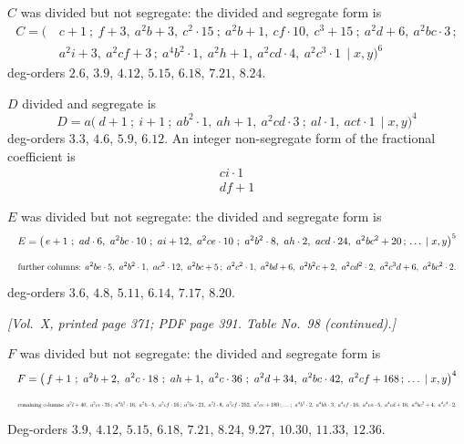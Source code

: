 \documentclass[11pt]{article}
\begin{document}
\noindent$C$ was divided but not segregate: the divided and segregate form is
\begin{align*}
C=\bigl(\,&c+1\ ;\ f+3,\ a^{2}b+3,\ c^{2}\cdot 15\ ;\ a^{2}b+1,\ cf\cdot 10,\ c^{3}+15\ ;\ a^{2}d+6,\ a^{2}bc\cdot 3\,;\\
&a^{2}i+3,\ a^{2}cf+3\,;\ a^{4}b^{2}\cdot 1,\ a^{2}h+1,\ a^{2}cd\cdot 4,\ a^{2}c^{3}\cdot 1\,\mid x,y\bigr)^{6}
\end{align*}
deg-orders $2.6$, $3.9$, $4.12$, $5.15$, $6.18$, $7.21$, $8.24$.

\medskip

\noindent$D$ divided and segregate is
\[
D=a\bigl(\ d+1\ ;\ i+1\ ;\ ab^{2}\cdot 1,\ ah+1,\ a^{2}cd\cdot 3\ ;\ al\cdot 1,\ act\cdot 1\,\mid x,y\bigr)^{4}
\]
deg-orders $3.3$, $4.6$, $5.9$, $6.12$. An integer non-segregate form of the fractional coefficient is
\[
\begin{array}{r}
ci\cdot 1\\
df+1
\end{array}
\]

\medskip

\noindent$E$ was divided but not segregate: the divided and segregate form is
\[
\resizebox{\textwidth}{!}{$\displaystyle
E=\bigl(\,e+1\ ;\ ad\cdot 6,\ a^{2}bc\cdot 10\ ;\ ai+12,\ a^{2}ce\cdot 10\ ;\ a^{2}b^{2}\cdot 8,\ ah\cdot 2,\ acd\cdot 24,\ a^{2}bc^{2}+20\,;\,\ldots\,\mid x,y\bigr)^{5}
$}
\]
\[
\resizebox{\textwidth}{!}{$\displaystyle
\text{further columns: }a^{2}be\cdot 5,\ a^{2}b^{2}\cdot 1,\ ac^{2}\cdot 12,\ a^{2}bc+5\,;\ a^{2}c^{2}\cdot 1,\ a^{2}bd+6,\ a^{2}b^{2}c+2,\ a^{2}cd^{2}\cdot 2,\ a^{2}c^{3}d+6,\ a^{2}bc^{2}\cdot 2.
$}
\]
deg-orders $3.6$, $4.8$, $5.11$, $6.14$, $7.17$, $8.20$.

\newpage

\noindent\textit{[Vol.~X, printed page 371; PDF page 391. Table No.~98 (continued).]}

\medskip

\noindent$F$ was divided but not segregate: the divided and segregate form is
\[
\resizebox{\textwidth}{!}{$\displaystyle
F=\bigl(\,f+1\ ;\ a^{2}b+2,\ a^{2}c\cdot 18\ ;\ ah+1,\ a^{2}c\cdot 36\ ;\ a^{2}d+34,\ a^{2}bc\cdot 42,\ a^{2}cf+168\,;\,\ldots\,\mid x,y\bigr)^{4}
$}
\]
\[
\resizebox{\textwidth}{!}{$\displaystyle
\text{remaining columns: }a^{2}l+40,\ a^{2}ce\cdot 35\,;\ a^{4}b^{2}\cdot 16,\ a^{2}h\cdot 5,\ a^{2}cf\cdot 16\,;\ a^{2}be\cdot 21,\ a^{2}l\cdot 8,\ a^{2}cf\cdot 252,\ a^{2}ce+189\,;\ldots\,;\ a^{4}b^{2}\cdot 2,\ a^{4}bh\cdot 3,\ a^{4}cf\cdot 16,\ a^{4}cn\cdot 5,\ a^{4}cd+16,\ a^{4}bc^{2}+4,\ a^{4}c^{4}\cdot 2.
$}
\]
Deg-orders $3.9$, $4.12$, $5.15$, $6.18$, $7.21$, $8.24$, $9.27$, $10.30$, $11.33$, $12.36$.
\end{document}
